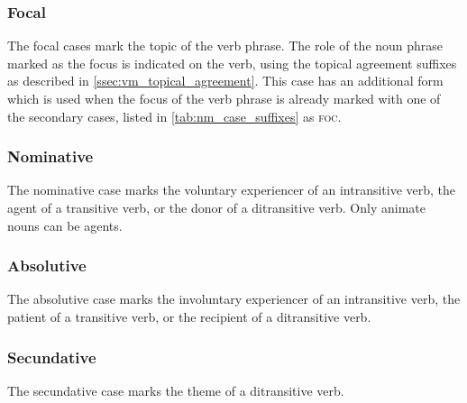 \documentclass[grammar]{subfiles}
\begin{document}
%

  \subsubsection{Focal}
  \label{nm_focal_case}

  The focal cases mark the topic of the verb phrase.  The role of the
  noun phrase marked as the focus is indicated on the verb, using the topical
  agreement suffixes as described in \cref{ssec:vm_topical_agreement}.
  This case has an additional form which is used when the focus of the verb
  phrase is already marked with one of the secondary cases, listed in
  \cref{tab:nm_case_suffixes} as \textsc{foc}.

  \subsubsection{Nominative}
  \label{nm_nominative_case}

  The nominative case marks the voluntary experiencer of an intransitive verb,
  the agent of a transitive verb, or the donor of a ditransitive verb.  Only
  animate nouns can be agents.

  \subsubsection{Absolutive}
  \label{nm_absolutive_case}

  The absolutive case marks the involuntary experiencer of an
  intransitive verb, the patient of a transitive verb, or the recipient of a
  ditransitive verb.

  \subsubsection{Secundative}
  \label{nm_secundative_case}

  The secundative case marks the theme of a ditransitive verb.

%
\end{document}
